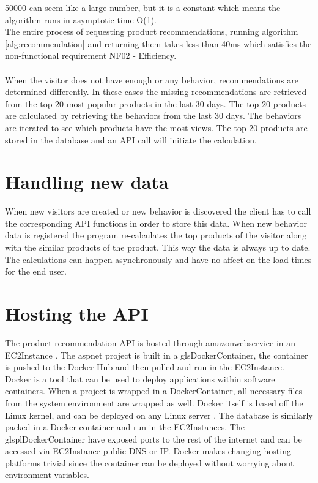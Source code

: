 50000 can seem like a large number, but it is a constant which means the algorithm runs in asymptotic time O(1). \\
The entire process of requesting product recommendations, running algorithm \ref{alg:recommendation} and returning them takes less than 40ms which satisfies the non-functional requirement NF02 - Efficiency. \\\\
When the visitor does not have enough or any behavior, recommendations are determined differently. In these cases the missing recommendations are retrieved from the top 20 most popular products in the last 30 days. The top 20 products are calculated by retrieving the behaviors from the last 30 days. The behaviors are iterated to see which products have the most views. The top 20 products are stored in the database and an \gls{API} call will initiate the calculation.

\section{Handling new data}
When new visitors are created or new behavior is discovered the client has to call the corresponding \gls{API} functions in order to store this data. When new behavior data is registered the program re-calculates the top products of the visitor along with the similar products of the product. This way the data is always up to date. The calculations can happen asynchronously and have no affect on the load times for the end user.

\section{Hosting the \gls{API}}
The product recommendation \gls{API} is hosted through \gls{amazonwebservice} in an \gls{EC2Instance} \cite{EC2}. The \gls{aspnet} project is built in a gls{DockerContainer}, the container is pushed to the \gls{Docker} Hub and then pulled and run in the \gls{EC2Instance}. \gls{Docker} is a tool that can be used to deploy applications within software containers. When a project is wrapped in a \gls{DockerContainer}, all necessary files from the system environment are wrapped as well. \gls{Docker} itself is based off the Linux kernel, and can be deployed on any Linux server \cite{Docker}.  The database is similarly packed in a \gls{Docker} container and run in the \glspl{EC2Instance}. The glspl{DockerContainer} have exposed ports to the rest of the internet and can be accessed via \gls{EC2Instance} public DNS or IP.  \gls{Docker} makes changing hosting platforms trivial since the container can be deployed without worrying about environment variables.



			


 